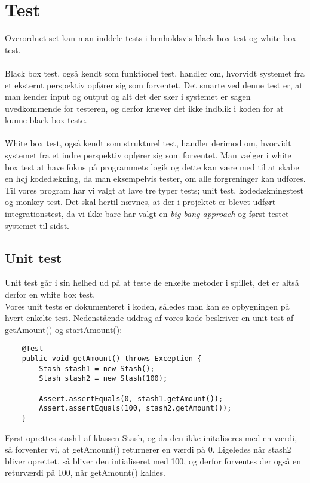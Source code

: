 \chapter{Test}
Overordnet set kan man inddele tests i henholdsvis black box test og white box test.\\\\
Black box test, også kendt som funktionel test, handler om, hvorvidt systemet fra et eksternt perspektiv opfører sig som forventet.
Det smarte ved denne test er, at man kender input og output og alt det der sker i systemet er sagen uvedkommende for testeren, og derfor kræver det ikke indblik i koden for at kunne black box teste.\\\\
White box test, også kendt som strukturel test, handler derimod om, hvorvidt systemet fra et indre perspektiv opfører sig som forventet.
Man vælger i white box test at have fokus på programmets logik og dette kan være med til at skabe en høj kodedækning, da man eksempelvis tester, om alle forgreninger kan udføres.
\\Til vores program har vi valgt at lave tre typer tests; unit test, kodedækningstest og monkey test.
Det skal hertil nævnes, at der i projektet er blevet udført integrationstest, da vi ikke bare har valgt en \textit{big bang-approach} og først testet systemet til sidst.
\section{Unit test}
Unit test går i sin helhed ud på at teste de enkelte metoder i spillet, det er altså derfor en white box test. \\
Vores unit tests er dokumenteret i koden, således man kan se opbygningen på hvert enkelte test.
Nedenstående uddrag af vores kode beskriver en unit test af getAmount() og startAmount():\\
\begin{lstlisting}
    @Test
    public void getAmount() throws Exception {
        Stash stash1 = new Stash();
        Stash stash2 = new Stash(100);

        Assert.assertEquals(0, stash1.getAmount());
        Assert.assertEquals(100, stash2.getAmount());
    }
\end{lstlisting}
Først oprettes stash1 af klassen Stash, og da den ikke initaliseres med en værdi, så forventer vi, at getAmount() returnerer en værdi på 0.
Ligeledes når stash2 bliver oprettet, så bliver den intialiseret med 100, og derfor forventes der også en returværdi på 100, når getAmount() kaldes.

